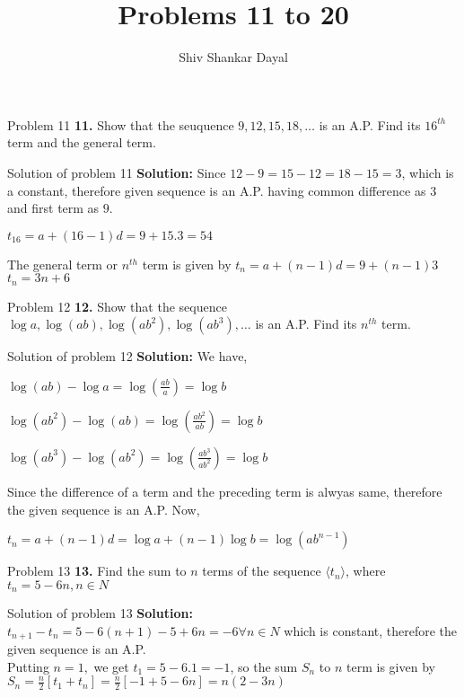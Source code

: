 \documentclass[aspectratio=1610,8pt]{beamer}
\title{Problems 11 to 20}
\author[Shiv Shankar Dayal]{Shiv Shankar Dayal}
\begin{document}
\begin{frame}
       \titlepage
\end{frame}

\begin{frame}{Problem 11}
  \textbf{11.} Show that the seuquence $9, 12, 15, 18, \ldots$ is an A.P. Find
  its $16^{th}$ term and the general term.
\end{frame}
\begin{frame}{Solution of problem 11}
  \textbf{Solution:} Since $12 - 9 = 15 - 12 = 18 - 15 = 3$, which is a constant, therefore given
  sequence is an A.P. having common difference as $3$ and first term as $9$.

  $t_{16} = a + (16 - 1)d = 9 + 15.3 = 54$

  The general term or $n^{th}$ term is given by $t_n = a + (n - 1)d = 9 + (n -
  1)3$\\
  $t_n = 3n + 6$
\end{frame}
\begin{frame}{Problem 12}
  \textbf{12.} Show that the sequence $\log a, \log (ab), \log(ab^2),
  \log (ab^3), \ldots$ is an A.P. Find its $n^{th}$ term.
\end{frame}
\begin{frame}{Solution of problem 12}
  \textbf{Solution:} We have,

  $\log(ab) - \log a = \log \left(\frac{ab}{a}\right) = \log b$

  $\log(ab^2) - \log (ab) = \log \left(\frac{ab^2}{ab}\right) = \log b$

  $\log(ab^3) - \log (ab^2) = \log \left(\frac{ab^3}{ab^2}\right) = \log b$

  Since the difference of a term and the preceding term is alwyas same,
  therefore the given sequence is an A.P. Now,

  $t_n = a + (n - 1)d = \log a + (n - 1)\log b = \log(ab^{n - 1})$
\end{frame}
\begin{frame}{Problem 13}
  \textbf{13.} Find the sum to $n$ terms of the sequence $\langle t_n \rangle$,
  where $t_n = 5 -6n, n\in N$
\end{frame}
\begin{frame}{Solution of problem 13}
  \textbf{Solution:} $t_{n + 1} - t_n = 5 - 6(n + 1) - 5 + 6n = -6 \forall n
  \in N$ which is constant, therefore the given sequence is an A.P.\\
  Putting $n = 1,$ we get $t_1 = 5 - 6.1 = -1$, so the sum $S_n$ to $n$ term is
  given by\\
  $S_n = \frac{n}{2}[t_1 + t_n] = \frac{n}{2}[-1 + 5 - 6n] = n(2 - 3n)$
\end{frame}
\end{document}
